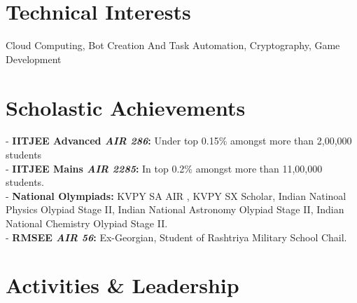 \documentclass[a4paper,10pt]{extarticle} %
\begin{document}
\vspace{-0.3cm}
\section{\textcolor{primary}{Technical Interests}}

\noindent Cloud Computing, Bot Creation And Task Automation, Cryptography, Game Development \\


\vspace{-0.3cm}
\section{\textcolor{primary}{Scholastic Achievements}}

- \textbf{IITJEE Advanced \emph{AIR 286}:} Under top 0.15\% amongst more than 2,00,000 students \\
- \textbf{IITJEE Mains \emph{AIR 2285}:} In top 0.2\% amongst more than 11,00,000 students. \\
- \textbf{National Olympiads:} KVPY SA AIR , KVPY SX Scholar, Indian Natinoal Physics Olypiad Stage II, Indian National Astronomy Olypiad Stage II, Indian National Chemistry Olypiad Stage II. \\
- \textbf{RMSEE \emph{AIR 56}:} Ex-Georgian, Student of Rashtriya Military School Chail. \\




\vspace{-0.3cm}
\section{\textcolor{primary}{Activities \& Leadership}}
\end{document}
